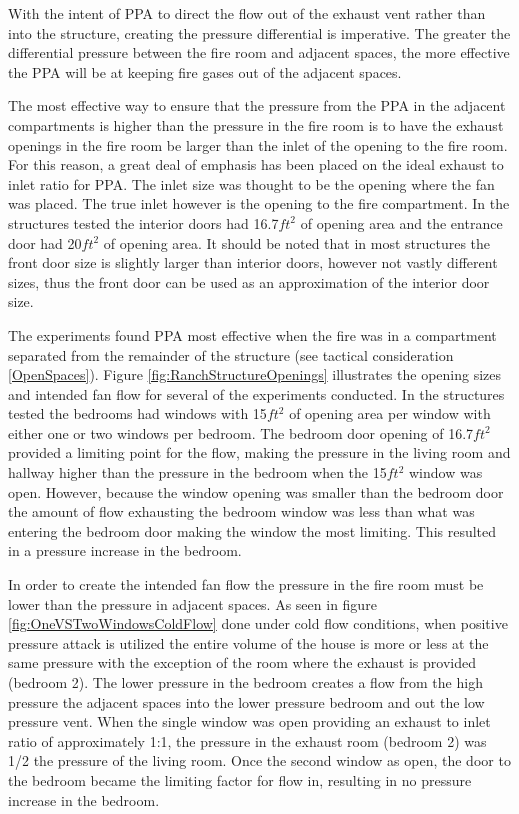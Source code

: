 \documentclass{article}
\begin{document}
With the intent of PPA to direct the flow out of the exhaust vent rather than into the structure, creating the pressure differential is imperative. The greater the differential pressure between the fire room and adjacent spaces, the more effective the PPA will be at keeping fire gases out of the adjacent spaces.

The most effective way to ensure that the pressure from the PPA in the adjacent compartments is higher than the pressure in the fire room is to have the exhaust openings in the fire room be larger than the inlet of the opening to the fire room.  For this reason, a great deal of emphasis has been placed on the ideal exhaust to inlet ratio for PPA. The inlet size was thought to be the opening where the fan was placed. The true inlet however is the opening to the fire compartment. In the structures tested the interior doors had 16.7$ft^2$ of opening area and the entrance door had 20$ft^2$ of opening area. It should be noted that in most structures the front door size is slightly larger than interior doors, however not vastly different sizes, thus the front door can be used as an approximation of the interior door size.

The experiments found PPA most effective when the fire was in a compartment separated from the remainder of the structure (see tactical consideration \ref{OpenSpaces}). Figure \ref{fig:RanchStructureOpenings} illustrates the opening sizes and intended fan flow for several of the experiments conducted. In the structures tested the bedrooms had windows with 15$ft^2$ of opening area per window with either one or two windows per bedroom. The bedroom door opening of 16.7$ft^2$ provided a limiting point for the flow, making the pressure in the living room and hallway higher than the pressure in the bedroom when the 15$ft^2$ window was open. However, because the window opening was smaller than the bedroom door the amount of flow exhausting the bedroom window was less than what was entering the bedroom door making the window the most limiting. This resulted in a pressure increase in the bedroom. 

In order to create the intended fan flow the pressure in the fire room must be lower than the pressure in adjacent spaces. As seen in figure \ref{fig:OneVSTwoWindowsColdFlow} done under cold flow conditions, when positive pressure attack is utilized the entire volume of the house is more or less at the same pressure with the exception of the room where the exhaust is provided (bedroom 2). The lower pressure in the bedroom creates a flow from the high pressure the adjacent spaces into the lower pressure bedroom and out the low pressure vent. When the single window was open providing an exhaust to inlet ratio of approximately 1:1, the pressure in the exhaust room (bedroom 2) was 1/2 the pressure of the living room. Once the second window as open, the door to the bedroom became the limiting factor for flow in, resulting in no pressure increase in the bedroom.
\end{document}

